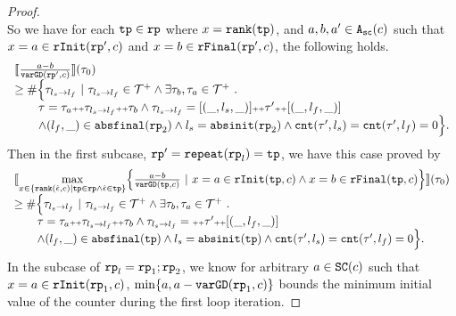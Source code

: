\begin{proof}
\\
So we have for each $\mathtt{tp} \in \mathtt{rp}$ where $x = \mathtt{rank}(\mathtt{tp})$,
and $a, b, a ' \in {\ensuremath{\mathtt{A_{sc}}}}(c)$
such that $x = a \in \mathtt{rInit}(\mathtt{rp}', c)$ and $x = b \in \mathtt{rFinal}(\mathtt{rp}', c)$,
the following holds.
\[
  \begin{array}{l}
  \llbracket \frac{a - b}{\mathtt{varGD}(\mathtt{rp}', c)} \rrbracket(\mathtt{\tau}_0) 
  \\ \geq
    \# \Big\{\mathtt{\tau}_{l_s \to l_f} 
    ~\vert~ \mathtt{\tau}_{l_s \to l_f} \in \mathcal{T}^{+} \land \exists  \mathtt{\tau}_b, \mathtt{\tau}_a \in \mathcal{T}^{+}
    ~.~ 
    \\ \qquad
    \mathtt{\tau} = \mathtt{\tau}_a {\scriptscriptstyle ++} \mathtt{\tau}_{l_s \to l_f} {\scriptscriptstyle ++} \mathtt{\tau}_b
    \land \mathtt{\tau}_{l_s \to l_f} = [(\_, l_s, \_)] {\scriptscriptstyle ++} \mathtt{\tau}' {\scriptscriptstyle ++} [(\_, l_f, \_)]
    \\ \qquad
    \land (l_{f}, \_) \in \mathtt{abs}{\mathtt{final}}(\mathtt{rp}_2)
    \land l_s = \mathtt{abs}{\mathtt{init}}(\mathtt{rp}_2)
    \land \mathtt{cnt}(\mathtt{\tau}', l_s) = \mathtt{cnt}(\mathtt{\tau}', l_f) = 0 
    \Big\}.
    \end{array}
\]
Then in the first subcase, $\mathtt{rp}' = \mathtt{repeat}(\mathtt{rp}_l) = \mathtt{tp}$, we have this case proved by
\[
  \begin{array}{l}
    \econfig{
      \max\limits_{x \in \left\{ \rank(\absevent, c) | \tpath \in \rprog \land \absevent \in \tpath \right\}}
      \left\{ \highlight{\frac{a - b}{\varGD(\tpath, c)}} ~\vert~
      x = a \in \rfinit(\tpath, c)
      \land x = b \in \rffinal(\tpath, c)
      \right\} 
    }(\trace_0) \\
    \geq
    \# \Big\{\trace_{l_s \to l_f} 
    ~\vert~ \trace_{l_s \to l_f} \in \ftdom \land \exists  \trace_b, \trace_a \in \ftdom
    \sthat 
    \\ \qquad
    \trace = \trace_a \tracecat \trace_{l_s \to l_f} \tracecat \trace_b
    \land \trace_{l_s \to l_f} = \tracecat \trace' \tracecat [(\_, l_f, \_)]
    \\ \qquad
    \land (l_{f}, \_) \in \absfinal(\tpath)
    \land l_s = \absinit(\tpath)
    \land \counter(\trace', l_s) = \counter(\trace', l_f) = 0 
    \Big\}.
    \end{array}
\]
In the subcase of $\mathtt{rp}_l = \mathtt{rp}_1; \mathtt{rp}_2$, 
we know for arbitrary $a \in \mathtt{SC}(c)$ such that $x = a \in \mathtt{rInit}(\mathtt{rp}_1, c)$,
$\min\{ a, a - \mathtt{varGD}(\mathtt{rp}_1, c) \}$ bounds the minimum initial value of the counter during the first loop iteration.


\end{proof}
